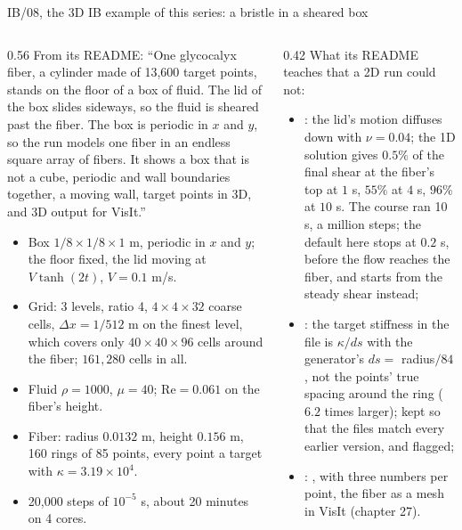 \documentclass[aspectratio=169,11pt]{beamer}
\begin{document}
\begin{frame}{IB/08, the 3D IB example of this series: a bristle in a sheared box}
\label{fr:ib08}
\begin{columns}[T,onlytextwidth]
\begin{column}{0.56\textwidth}
\footnotesize From its README: ``One glycocalyx fiber, a cylinder made of 13,600 target points, stands on the floor of a box of fluid. The lid of the box slides sideways, so the fluid is sheared past the fiber. The box is periodic in $x$ and $y$, so the run models one fiber in an endless square array of fibers. It shows a box that is not a cube, periodic and wall boundaries together, a moving wall, target points in 3D, and 3D output for VisIt.''
\begin{itemize}\footnotesize
  \item Box $1/8\times1/8\times1$ m, periodic in $x$ and $y$; the floor fixed, the lid moving at $V\tanh(2t)$, $V = 0.1$ m/s.
  \item Grid: 3 levels, ratio 4, $4\times4\times32$ coarse cells, $\Delta x = 1/512$ m on the finest level, which covers only $40\times40\times96$ cells around the fiber; $161{,}280$ cells in all.
  \item Fluid $\rho = 1000$, $\mu = 40$; $\mathrm{Re} = 0.061$ on the fiber's height.
  \item Fiber: radius $0.0132$ m, height $0.156$ m, 160 rings of 85 points, every point a target with $\kappa = 3.19\times10^4$.
  \item 20,000 steps of $10^{-5}$ s, about 20 minutes on 4 cores.
\end{itemize}
\end{column}
\begin{column}{0.42\textwidth}
\scriptsize What its README teaches that a 2D run could not:
\begin{itemize}
  \item {}: the lid's motion diffuses down with $\nu = 0.04$; the 1D solution gives $0.5\%$ of the final shear at the fiber's top at $1$ s, $55\%$ at $4$ s, $96\%$ at $10$ s. The course ran 10 s, a million steps; the default here stops at $0.2$ s, before the flow reaches the fiber, and  starts from the steady shear instead;
  \item {}: the target stiffness in the file is $\kappa/ds$ with the generator's $ds = $ radius$/84$, not the points' true spacing around the ring ($6.2$ times larger); kept so that the files match every earlier version, and flagged;
  \item {}: ,  with three numbers per point, the fiber as a mesh in VisIt (chapter 27).
\end{itemize}
\end{column}
\end{columns}
\end{frame}
\end{document}
